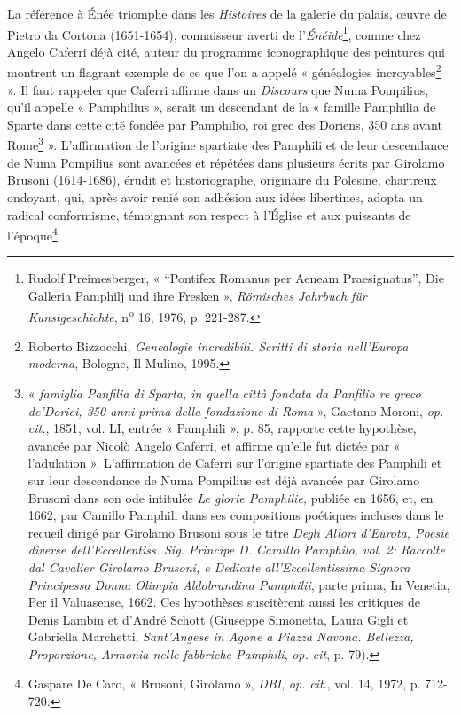 \documentclass[12pt,twoside,openany]{book}
\begin{document}
La référence à Énée triomphe dans les \textit{Histoires }de la galerie du palais, œuvre de Pietro da Cortona (1651-1654), connaisseur averti de l’\textit{Énéide}\footnote{Rudolf Preimesberger, « “Pontifex Romanus per Aeneam Praesignatus”, Die Galleria Pamphilj und ihre Fresken », \textit{Römisches Jahrbuch für Kunstgeschichte}, n\textsuperscript{o} 16, 1976, p. 221-287.}, comme chez Angelo Caferri déjà cité, auteur du programme iconographique des peintures qui montrent un flagrant exemple de ce que l’on a appelé « généalogies incroyables\footnote{Roberto Bizzocchi, \textit{Genealogie incredibili. Scritti di storia nell’Europa moderna}, Bologne, Il Mulino, 1995.} ». Il faut rappeler que Caferri affirme dans un \textit{Discours }que Numa Pompilius, qu’il appelle « Pamphilius », serait un descendant de la « famille Pamphilia de Sparte dans cette cité fondée par Pamphilio, roi grec des Doriens, 350 ans avant Rome\footnote{« \textit{famiglia Panfilia di Sparta, in quella città fondata da Panfilio re greco de’Dorici, 350 anni prima della fondazione di Roma }», Gaetano Moroni, \textit{op. cit.}, 1851, vol. LI, entrée « Pamphili », p. 85, rapporte cette hypothèse, avancée par Nicolò Angelo Caferri, et affirme qu’elle fut dictée par « l’adulation ». L’affirmation de Caferri sur l’origine spartiate des Pamphili et sur leur descendance de Numa Pompilius est déjà avancée par Girolamo Brusoni dans son ode intitulée \textit{Le glorie Pamphilie, }publiée en 1656, et, en 1662, par Camillo Pamphili dans ses compositions poétiques incluses dans le recueil dirigé par Girolamo Brusoni sous le titre\textit{ Degli Allori d’Eurota, Poesie diverse dell’Eccellentiss. Sig. Principe D. Camillo Pamphilo, vol. 2: Raccolte dal Cavalier Girolamo Brusoni, e Dedicate all'Eccellentissima Signora Principessa Donna Olimpia Aldobrandina Pamphilii}, parte prima, In Venetia, Per il Valuasense, 1662. Ces hypothèses suscitèrent aussi les critiques de Denis Lambin et d’André Schott (Giuseppe Simonetta, Laura Gigli et Gabriella Marchetti, \textit{Sant’Angese in Agone a Piazza Navona. Bellezza, Proporzione, Armonia nelle fabbriche Pamphili}, \textit{op. cit}, p. 79).} ». L’affirmation de l’origine spartiate des Pamphili et de leur descendance de Numa Pompilius sont avancées et répétées dans plusieurs écrits par Girolamo Brusoni (1614-1686), érudit et historiographe, originaire du Polesine, chartreux ondoyant, qui, après avoir renié son adhésion aux idées libertines, adopta un radical conformisme, témoignant son respect à l’Église et aux puissants de l’époque\footnote{Gaspare De Caro, « Brusoni, Girolamo »,\textit{ DBI}, \textit{op. cit}., vol. 14, 1972, p. 712-720.}.
\end{document}
